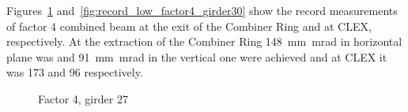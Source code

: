 

Figures~\ref{fig:record_low_factor4_girder27} and~\ref{fig:record_low_factor4_girder30} show 
the record measurements of factor 4 combined beam at the exit of the Combiner Ring and at CLEX, respectively.
At the extraction of the Combiner Ring 148~mm~mrad in horizontal plane was and 91~mm~mrad in the vertical one
were achieved and at CLEX it was 173 and 96 respectively.




\begin{figure}[!h]
 \begin{center}
   
 \end{center}
\caption{Factor 4, girder 27}
\label{fig:record_low_factor4_girder27}
\end{figure}




%
%


